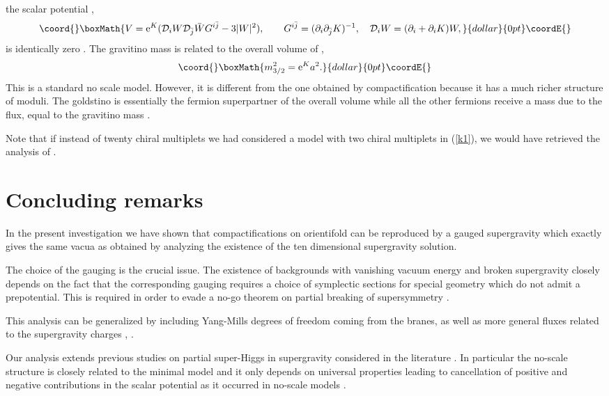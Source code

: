 \documentclass[a4paper,12pt]{article}
\begin{document}
the scalar potential \cite{cfgp},
$$\coord{}\boxMath{V=\mathrm{e}^K(\mathcal{D}_iW\mathcal{D}_{\bar j}\bar W G^{i\bar
j}-3|W|^2),\qquad  G^{i\bar j}=(\partial_i\partial_{\bar
j}K)^{-1},\quad \mathcal{D}_iW=(\partial_i+\partial_iK)W,}{dollar}{0pt}\coordE{}$$ is
identically zero \cite{cfkn,ckpdfwg,bcf}. The gravitino mass is
related to the overall volume of \coordHE{},
$$\coord{}\boxMath{m^2_{3/2}=\mathrm{e}^K a^2.}{dollar}{0pt}\coordE{}$$
This is a standard \coordHE{} no scale model. However, it is different
from the one obtained by \coordHE{} compactification because it
has a much richer structure of moduli. The goldstino is
essentially the fermion superpartner of the overall \coordHE{} volume while all the other fermions receive a mass due to
the flux, equal to the gravitino mass \cite{cfkn}.

Note that if instead of twenty  chiral multiplets we had
considered a model with two chiral multiplets in (\ref{k1}), we
would have retrieved the analysis of \cite{fpo}.



\section{Concluding remarks}


In the present investigation we have shown that compactifications
on \coordHE{} orientifold can be reproduced by a
gauged \coordHE{} supergravity which exactly gives the same \coordHE{}
vacua as obtained by analyzing the existence of the ten
dimensional supergravity solution.

The choice of the gauging is the crucial issue. The existence of
backgrounds with vanishing vacuum energy and broken supergravity
closely depends on the fact that the corresponding gauging
requires a choice of symplectic sections for special geometry
which do not admit a prepotential. This is required in order to
evade a no-go theorem on partial breaking of supersymmetry
\cite{mp}.

This analysis can be generalized by including Yang-Mills degrees
of freedom coming from the branes, as well as more general fluxes
related to the supergravity charges \coordHE{},
\coordHE{}.

Our analysis extends previous studies on partial super-Higgs in
\coordHE{} supergravity considered in the literature
\cite{ckpdfwg,fkpz,fklz,fgpt}. In particular the no-scale
structure is closely related to the minimal model \cite{cgp,fgp}
and it only depends on universal properties leading to
cancellation of positive and negative contributions in the scalar
potential as it occurred in \coordHE{} no-scale models
\cite{cfkn,elnt}.
\end{document}
